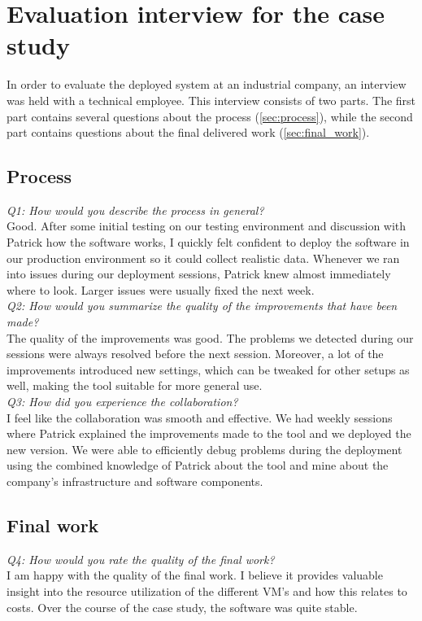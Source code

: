 \chapter{Evaluation interview for the case study} 
\label{ch:interview}
In order to evaluate the deployed system at an industrial company, an interview was held with a technical employee. This interview consists of two parts. The first part contains several questions about the process (\autoref{sec:process}), while the second part contains questions about the final delivered work (\autoref{sec:final_work}).

\section{Process} \label{sec:process}
\textit{Q1: How would you describe the process in general?}\\
Good. After some initial testing on our testing environment and discussion with Patrick how the software works, I quickly felt confident to deploy the software in our production environment so it could collect realistic data.
Whenever we ran into issues during our deployment sessions, Patrick knew almost immediately where to look. Larger issues were usually fixed the next week.\\

\noindent
\textit{Q2: How would you summarize the quality of the improvements that have been made?}\\
The quality of the improvements was good. The problems we detected during our sessions were always resolved before the next session.
Moreover, a lot of the improvements introduced new settings, which can be tweaked for other setups as well, making the tool suitable for more general use.\\

\noindent
\textit{Q3: How did you experience the collaboration?}\\
I feel like the collaboration was smooth and effective. We had weekly sessions where Patrick explained the improvements made to the tool and we deployed the new version.
We were able to efficiently debug problems during the deployment using the combined knowledge of Patrick about the tool and mine about the company's infrastructure and software components.

\newpage
\section{Final work} \label{sec:final_work}
\noindent
\textit{Q4: How would you rate the quality of the final work?}\\
I am happy with the quality of the final work. I believe it provides valuable insight into the resource utilization of the different VM's and how this relates to costs.
Over the course of the case study, the software was quite stable.\\

